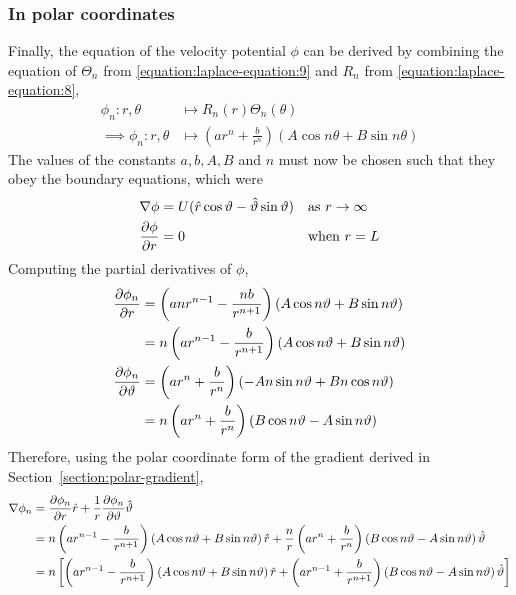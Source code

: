 \subsubsection{In polar coordinates}\label{section:VELOCITY:POLAR}
Finally, the equation of the velocity potential $\phi$ can be derived by combining the equation of $\Theta_n$ from \eqref{equation:laplace-equation:9}
and $R_n$ from \eqref{equation:laplace-equation:8},
\begin{align*}
    \phi_n:r,\theta&\mapsto R_n(r)\Theta_n(\theta)\\
    \implies\phi_n:r,\theta&\mapsto\left(ar^n+\frac{b}{r^n}\right)\left(A\cos n\theta+B\sin n\theta\right)
\end{align*}
The values of the constants $a,b,A,B$ and $n$ must now be chosen such that they obey the boundary equations, which were 
\begin{align*}
    \nabla\phi&=U(\hat{r}\cos\vartheta-\hat{\vartheta}\sin\vartheta) &&\text{as $r\rightarrow\infty$}\\
    \pdv{\phi}{r}&=0                                        &&\text{when $r=L$}
\end{align*}
Computing the partial derivatives of $\phi$,
\begin{align*}
    \pdv{\phi_n}{r}&=\left(anr^{n-1}-\frac{nb}{r^{n+1}}\right)\left(A\cos n\vartheta+B\sin n\vartheta\right)\\
    &=n\left(ar^{n-1}-\frac{b}{r^{n+1}}\right)\left(A\cos n\vartheta+B\sin n\vartheta\right)\\
    \pdv{\phi_n}{\vartheta}&=\left(ar^n+\frac{b}{r^n}\right)\left(-An\sin n\vartheta+Bn\cos n\vartheta\right)\\
    &=n\left(ar^n+\frac{b}{r^n}\right)\left(B\cos n\vartheta-A\sin n\vartheta\right)\\
\end{align*}
Therefore, using the polar coordinate form of the gradient derived in Section~\ref{section:polar-gradient},
\begin{align*}
    \nabla\phi_n&=\pdv{\phi_n}{r}\hat{r}+\frac{1}{r}\pdv{\phi_n}{\vartheta}\hat{\vartheta}\\
    &=n\left(ar^{n-1}-\frac{b}{r^{n+1}}\right)\left(A\cos n\vartheta+B\sin n\vartheta\right)\hat{r}+\frac{n}{r}\left(ar^n+\frac{b}{r^n}\right)\left(B\cos n\vartheta-A\sin n\vartheta\right)\hat{\vartheta}\\
    &=n\left[\left(ar^{n-1}-\frac{b}{r^{n+1}}\right)\left(A\cos n\vartheta+B\sin n\vartheta\right)\hat{r}+\left(ar^{n-1}+\frac{b}{r^{n+1}}\right)\left(B\cos n\vartheta-A\sin n\vartheta\right)\hat{\vartheta}\right]\\
\end{align*}

